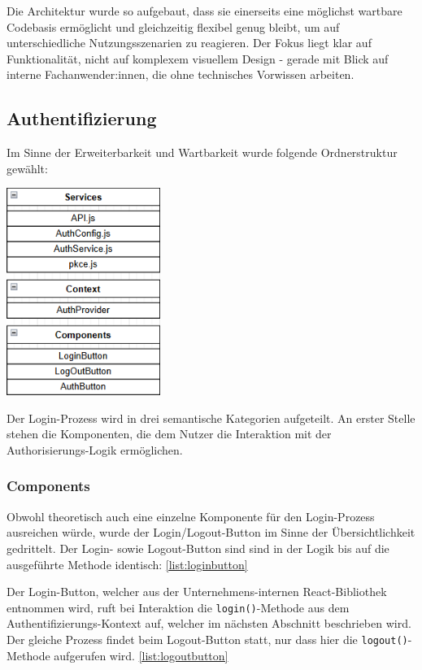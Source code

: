 Die Architektur wurde so aufgebaut, dass sie einerseits eine möglichst wartbare Codebasis ermöglicht und gleichzeitig flexibel genug bleibt, 
um auf unterschiedliche Nutzungsszenarien zu reagieren. Der Fokus liegt klar auf Funktionalität, nicht auf komplexem visuellem Design - 
gerade mit Blick auf interne Fachanwender:innen, die ohne technisches Vorwissen arbeiten.


\subsection{Authentifizierung}
Im Sinne der Erweiterbarkeit und Wartbarkeit wurde folgende Ordnerstruktur gewählt:\break
\begin{center}
    \includegraphics[width=5cm]{./img/fileStructure.png}
\end{center}


Der Login-Prozess wird in drei semantische Kategorien aufgeteilt. An erster Stelle stehen die Komponenten,
die dem Nutzer die Interaktion mit der Authorisierungs-Logik ermöglichen. 
\subsubsection{Components}
Obwohl theoretisch auch eine einzelne Komponente für den Login-Prozess ausreichen würde, wurde der Login/Logout-Button
im Sinne der Übersichtlichkeit gedrittelt. Der Login- sowie Logout-Button sind sind in der Logik bis auf die ausgeführte Methode identisch: \ref{list:loginbutton}

Der Login-Button, welcher aus der Unternehmens-internen React-Bibliothek entnommen wird, ruft bei Interaktion die \texttt{login()}-Methode 
aus dem Authentifizierungs-Kontext auf, welcher im nächsten Abschnitt beschrieben wird.\break
Der gleiche Prozess findet beim Logout-Button statt, nur dass hier die \texttt{logout()}-Methode aufgerufen wird. \ref{list:logoutbutton}

